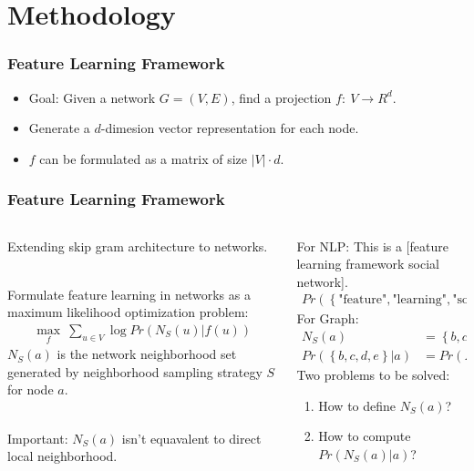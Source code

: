 \documentclass[notes, 10pt, aspectratio=169]{beamer}
\begin{document}
\section{Methodology}
\begin{frame}
    \frametitle{Feature Learning Framework}
    \begin{itemize}
        \item Goal: Given a network $G=(V, E)$, find a projection $f:\ V \rightarrow R^d$.
        \item Generate a $d$-dimesion vector representation for each node.
        \item $f$ can be formulated as a matrix of size $\left| V \right| \cdot d$.
    \end{itemize}
\end{frame}

\begin{frame}
    \frametitle{Feature Learning Framework}
    \begin{columns}
        \begin{column}{0.5\textwidth}
            Extending skip gram architecture to networks.\par ~\\
            Formulate feature learning in networks as a maximum likelihood optimization problem:
            \begin{align*}
                \max_{f}\ \sum_{u\in V}\log Pr\left( N_S\left( u \right)| f(u)  \right) 
            \end{align*}
            $N_S\left( a \right)$ is the network neighborhood set generated by neighborhood sampling strategy $S$ for node $a$.\par ~\\
            Important: $N_S\left( a \right)$ isn’t equavalent to direct local neighborhood.
        \end{column}
        \begin{column}{0.5\textwidth}
            For NLP: This is a [feature learning \alert{framework} social network].
            \begin{align*}
                \scriptstyle
                Pr \left( \left\{ \text{"feature"}, \text{"learning"}, \text{"social"}, \text{"network"} \right\} | \text{"framework"} \right) 
            \end{align*}
            For Graph:
            \begin{align*}
                N_S\left( a \right) &= \left\{ b, c, d, e \right\} \\
            Pr\left( \left\{ b, c, d, e \right\}| a \right) &= Pr\left( N_s\left( a \right) | a \right) 
            \end{align*}
            \pause
            Two problems to be solved:
            \begin{enumerate}
                \item How to define $N_S\left( a \right) $?
                \item How to compute $Pr\left( N_S\left( a \right) |a \right) $?
            \end{enumerate}
        \end{column}
    \end{columns}
\end{frame}
\end{document}
